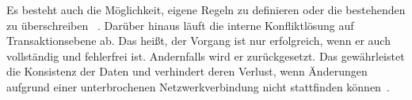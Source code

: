 Es besteht auch die Möglichkeit, eigene Regeln zu definieren oder die bestehenden zu überschreiben ~\cite{realm_conflict}.
Darüber hinaus läuft die interne Konfliktlösung auf Transaktionsebene ab.
Das heißt, der Vorgang ist nur erfolgreich, wenn er auch vollständig und fehlerfrei ist. Andernfalls wird er zurückgesetzt.
Das gewährleistet die Konsistenz der Daten und verhindert deren Verlust, wenn Änderungen aufgrund einer unterbrochenen Netzwerkverbindung nicht stattfinden können~\cite{realm_offline_whitepaper}.
